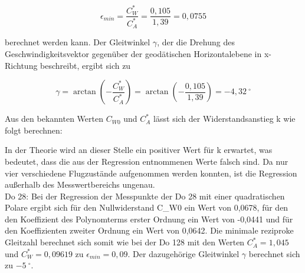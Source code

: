 \begin{equation}
\epsilon_{min} =  \frac {C_{W}^{\ast}} {C_{A}^{\ast}} = \frac{0,105} {1,39}=0,0755
\end{equation}

berechnet werden kann. Der Gleitwinkel $\gamma$, der die Drehung des Geschwindigkeitsvektor gegenüber der geodätischen Horizontalebene in x-Richtung beschreibt, ergibt sich zu

\begin{equation}
\gamma=\arctan \left(-\frac{C^{*}_W}{C^{*}_A} \right)= \arctan \left(-\frac{0,105}{1,39} \right)= -4,32 \ ^{\circ}  
\end{equation}

Aus den bekannten Werten $C_{W0}$ und $C^{*}_A$ lässt sich der Widerstandsanstieg k wie folgt berechnen: 


 In der Theorie wird an dieser Stelle ein positiver Wert für k erwartet, was bedeutet, dass die aus der Regression entnommenen Werte falsch sind. Da nur vier verschiedene Flugzustände aufgenommen werden konnten, ist die Regression außerhalb des Messwertbereichs ungenau. \\

Do 28:
Bei der Regression der Messpunkte der Do 28 mit einer quadratischen Polare ergibt sich für den Nullwiderstand C_{W0} ein Wert von 0,0678, für den den Koeffizient des Polynomterms erster Ordnung ein Wert von -0,0441 und für den Koeffizienten zweiter Ordnung ein Wert von 0,0642. Die minimale reziproke Gleitzahl berechnet sich somit wie bei der Do 128 mit den Werten 
$C^{*}_A=1,045$ und $C^{*}_W=0,09619$ zu $\epsilon_{min}=0,09$. 
Der dazugehörige Gleitwinkel $\gamma$ berechnet sich zu $-5 \ ^{\circ}$. 

